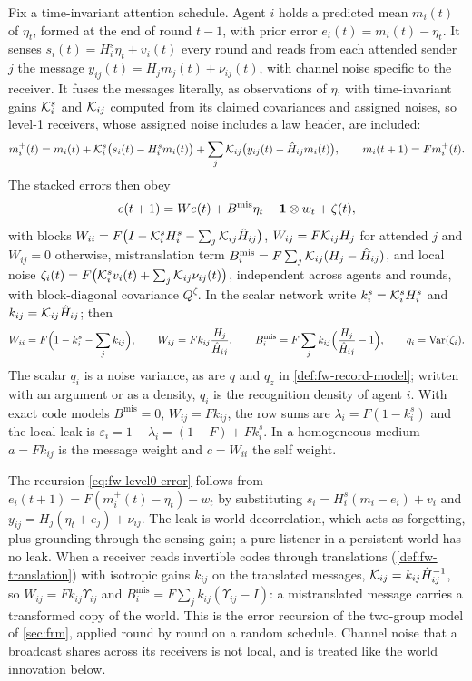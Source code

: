 \begin{definition}\label{def:fw-level0}
Fix a time-invariant attention schedule. Agent $i$ holds a predicted mean $m_i(t)$ of $\eta_t$, formed at the end of round $t-1$, with prior error $e_i(t)=m_i(t)-\eta_t$. It senses $s_i(t)=H^s_i\eta_t+v_i(t)$ every round and reads from each attended sender $j$ the message $y_{ij}(t)=H_jm_j(t)+\nu_{ij}(t)$, with channel noise specific to the receiver. It fuses the messages literally, as observations of $\eta$, with time-invariant gains $\mathcal{K}^s_i$ and $\mathcal{K}_{ij}$ computed from its claimed covariances and assigned noises, so level-1 receivers, whose assigned noise includes a law header, are included:
\[
m_i^+(t)=m_i(t)+\mathcal{K}^s_i\bigl(s_i(t)-H^s_im_i(t)\bigr)+\sum_j\mathcal{K}_{ij}\bigl(y_{ij}(t)-\hat H_{ij}m_i(t)\bigr),\qquad m_i(t+1)=Fm_i^+(t).
\]
The stacked errors then obey
\begin{equation}\label{eq:fw-level0-error}
e(t+1)=We(t)+B^{\mathrm{mis}}\eta_t-\mathbf{1}\otimes w_t+\zeta(t),
\end{equation}
with blocks $W_{ii}=F\bigl(I-\mathcal{K}^s_iH^s_i-\sum_j\mathcal{K}_{ij}\hat H_{ij}\bigr)$, $W_{ij}=F\mathcal{K}_{ij}H_j$ for attended $j$ and $W_{ij}=0$ otherwise, mistranslation term $B^{\mathrm{mis}}_i=F\sum_j\mathcal{K}_{ij}(H_j-\hat H_{ij})$, and local noise $\zeta_i(t)=F\bigl(\mathcal{K}^s_iv_i(t)+\sum_j\mathcal{K}_{ij}\nu_{ij}(t)\bigr)$, independent across agents and rounds, with block-diagonal covariance $Q^\zeta$. In the scalar network write $k^s_i=\mathcal{K}^s_iH^s_i$ and $k_{ij}=\mathcal{K}_{ij}\hat H_{ij}$; then
\[
W_{ii}=F\Bigl(1-k^s_i-\sum_jk_{ij}\Bigr),\qquad W_{ij}=Fk_{ij}\frac{H_j}{\hat H_{ij}},\qquad B^{\mathrm{mis}}_i=F\sum_jk_{ij}\Bigl(\frac{H_j}{\hat H_{ij}}-1\Bigr),\qquad q_i=\operatorname{Var}(\zeta_i).
\]
The scalar $q_i$ is a noise variance, as are $q$ and $q_z$ in \cref{def:fw-record-model}; written with an argument or as a density, $q_i$ is the recognition density of agent $i$. With exact code models $B^{\mathrm{mis}}=0$, $W_{ij}=Fk_{ij}$, the row sums are $\lambda_i=F(1-k^s_i)$ and the local leak is $\varepsilon_i=1-\lambda_i=(1-F)+Fk^s_i$. In a homogeneous medium $a=Fk_{ij}$ is the message weight and $c=W_{ii}$ the self weight.
\end{definition}

The recursion \eqref{eq:fw-level0-error} follows from $e_i(t+1)=F(m_i^+(t)-\eta_t)-w_t$ by substituting $s_i=H^s_i(m_i-e_i)+v_i$ and $y_{ij}=H_j(\eta_t+e_j)+\nu_{ij}$. The leak is world decorrelation, which acts as forgetting, plus grounding through the sensing gain; a pure listener in a persistent world has no leak. When a receiver reads invertible codes through translations (\cref{def:fw-translation}) with isotropic gains $k_{ij}$ on the translated messages, $\mathcal{K}_{ij}=k_{ij}\hat H_{ij}^{-1}$, so $W_{ij}=Fk_{ij}\Upsilon_{ij}$ and $B^{\mathrm{mis}}_i=F\sum_jk_{ij}(\Upsilon_{ij}-I)$: a mistranslated message carries a transformed copy of the world. This is the error recursion of the two-group model of \cref{sec:frm}, applied round by round on a random schedule. Channel noise that a broadcast shares across its receivers is not local, and is treated like the world innovation below.

